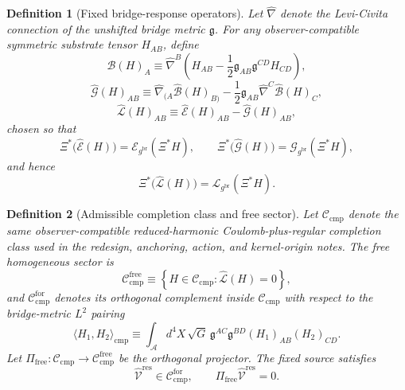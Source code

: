 \documentclass[11pt]{article}
\newcommand{\Sub}{\mathcal A}
\newcommand{\ObserverMap}{\Xi}
\newcommand{\BridgeMetric}{\mathfrak g}
\newcommand{\ObserverMetric}{g^{\mathrm{br}}}
\newcommand{\ResidualLift}{\widehat{\mathcal V}^{\mathrm{res}}}
\newcommand{\SubEinLin}{\widehat{\mathcal E}}
\newcommand{\SubGaugeVec}{\widehat{\mathcal B}}
\newcommand{\SubGaugeBook}{\widehat{\mathcal G}}
\newcommand{\SubReducedEin}{\widehat{\mathcal L}}
\newcommand{\FreeProj}{\Pi_{\mathrm{free}}}
\newcommand{\ReducedEin}{\mathcal L_{\ObserverMetric}}
\newcommand{\GaugeBook}{\mathcal G_{\ObserverMetric}}
\newcommand{\EinLin}{\mathcal E_{\ObserverMetric}}
\newcommand{\CompClass}{\mathscr C_{\mathrm{cmp}}}
\newcommand{\CompFree}{\mathscr C_{\mathrm{cmp}}^{\mathrm{free}}}
\newcommand{\CompForced}{\mathscr C_{\mathrm{cmp}}^{\mathrm{for}}}
\newtheorem{definition}{Definition}
\begin{document}
\begin{definition}[Fixed bridge-response operators]
\label{def:operators}
Let \(\widehat\nabla\) denote the Levi-Civita connection of the unshifted bridge metric \(\BridgeMetric\). For any observer-compatible symmetric substrate tensor \(H_{AB}\), define
\begin{equation}
\SubGaugeVec(H)_A
\equiv
\widehat\nabla^B\!\left(
H_{AB}
-\frac12 \BridgeMetric_{AB}\BridgeMetric^{CD}H_{CD}
\right),
\label{eq:subB}
\end{equation}
\begin{equation}
\SubGaugeBook(H)_{AB}
\equiv
\widehat\nabla_{(A}\SubGaugeVec(H)_{B)}
-\frac12 \BridgeMetric_{AB}\widehat\nabla^C\SubGaugeVec(H)_C,
\label{eq:subG}
\end{equation}
\begin{equation}
\SubReducedEin(H)_{AB}
\equiv
\SubEinLin(H)_{AB}-\SubGaugeBook(H)_{AB},
\label{eq:subL}
\end{equation}
chosen so that
\begin{equation}
\ObserverMap^*\bigl(\SubEinLin(H)\bigr)=\EinLin(\ObserverMap^*H),
\qquad
\ObserverMap^*\bigl(\SubGaugeBook(H)\bigr)=\GaugeBook(\ObserverMap^*H),
\label{eq:intertwine1}
\end{equation}
and hence
\begin{equation}
\ObserverMap^*\bigl(\SubReducedEin(H)\bigr)
=
\ReducedEin(\ObserverMap^*H).
\label{eq:intertwine2}
\end{equation}
\end{definition}

\begin{definition}[Admissible completion class and free sector]
\label{def:class}
Let \(\CompClass\) denote the same observer-compatible reduced-harmonic Coulomb-plus-regular completion class used in the redesign, anchoring, action, and kernel-origin notes. The free homogeneous sector is
\begin{equation}
\CompFree
\equiv
\left\{
H\in\CompClass:\SubReducedEin(H)=0
\right\},
\label{eq:freeclass}
\end{equation}
and \(\CompForced\) denotes its orthogonal complement inside \(\CompClass\) with respect to the bridge-metric \(L^2\) pairing
\begin{equation}
\langle H_1,H_2\rangle_{\mathrm{cmp}}
\equiv
\int_{\Sub} d^4X\,\sqrt{G}\,
\BridgeMetric^{AC}\BridgeMetric^{BD}(H_1)_{AB}(H_2)_{CD}.
\label{eq:inner}
\end{equation}
Let \(\FreeProj:\CompClass\to\CompFree\) be the orthogonal projector. The fixed source satisfies
\begin{equation}
\ResidualLift\in\CompForced,
\qquad
\FreeProj\ResidualLift=0.
\label{eq:sourcefree}
\end{equation}
\end{definition}
\end{document}
